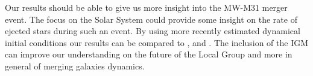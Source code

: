 \documentclass[10pt,english]{article}
\begin{document}
\smallskip
Our results should be able to give us more insight into the MW-M31 merger event. The focus on the Solar System could provide some insight on the rate of ejected stars during such an event. By using more recently estimated dynamical initial conditions our results can be compared to \textcite{Cox_2008}, \textcite{van_der_Marel_2012b} and \textcite{Schiavi_2019}. The inclusion of the IGM can improve our understanding on the future of the Local Group and more in general of merging galaxies dynamics.\par
\smallskip

\end{document}
